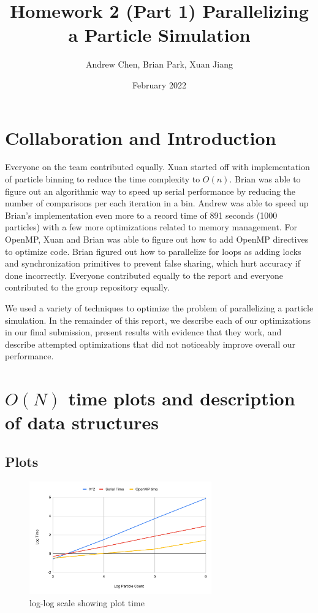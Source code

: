 \documentclass{article}
\title{Homework 2 (Part 1) Parallelizing a Particle Simulation}
\author{Andrew Chen, Brian Park, Xuan Jiang}
\date{February 2022}
\begin{document}
\maketitle
\section{Collaboration and Introduction}
Everyone on the team contributed equally. Xuan started off with implementation of particle binning to reduce the time complexity to $O(n)$. Brian was able to figure out an algorithmic way to speed up serial performance by reducing the number of comparisons per each iteration in a bin. Andrew was able to speed up Brian's implementation even more to a record time of 891 seconds (1000 particles) with a few more optimizations related to memory management. For OpenMP, Xuan and Brian was able to figure out how to add OpenMP directives to optimize code. Brian figured out how to parallelize for loops as adding locks and synchronization primitives to prevent false sharing, which hurt accuracy if done incorrectly. Everyone contributed equally to the report and everyone contributed to the group repository equally.

We used a variety of techniques to optimize the problem of parallelizing a particle simulation.
In the remainder of this report, we describe each of our optimizations in our final submission,
present results with evidence that they work, and describe attempted optimizations that did not
noticeably improve overall our performance.

\section{$O(N)$ time plots and description of data structures} 
\subsection{Plots}

\begin{figure}[H] %
\centering %
\includegraphics[width=0.7\textwidth]{log_plots.pdf} %
\caption{log-log scale showing plot time} %
\label{log-log scale showing plot time} %
\end{figure}
\end{document}
